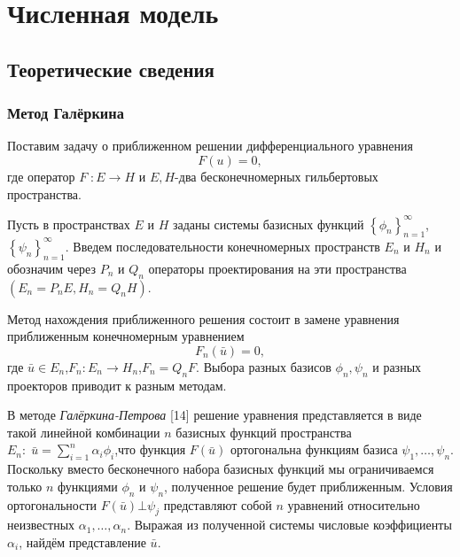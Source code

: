 \documentclass[a4paper,14pt]{extarticle}
\begin{document}
\newpage

\section{Численная модель}

\subsection{Теоретические сведения}

\subsubsection{Метод Галёркина}

Поставим задачу о приближенном решении дифференциального уравнения 
\begin{equation}
F(u)=0,
\end{equation}
где оператор $F\; : E \rightarrow H$ и $E,H$-два бесконечномерных гильбертовых пространства. 

Пусть в пространствах $E$ и $H$ заданы системы базисных функций  $\left\{\phi_n\right\}_{n=1}^\infty$, \\ $\left\{\psi_n\right\}_{n=1}^\infty$. Введем последовательности конечномерных пространств $E_n$ и $H_n$ и обозначим через $P_n$ и $Q_n$ операторы проектирования на эти пространства $(E_n=P_n E,H_n=Q_n H)$. 

Метод нахождения приближенного решения состоит в замене уравнения приближенным конечномерным уравнением 
\begin{equation}
F_n(\bar{u})=0,
\end{equation}
где $\bar{u}\in E_n$,$F_n:E_n\rightarrow H_n$,$F_n=Q_n F$. Выбора разных базисов $\phi_n,\psi_n$ и разных проекторов приводит к разным методам. 

В методе \textit{Галёркина-Петрова} [14] решение уравнения представляется в виде такой линейной комбинации $n$ базисных функций пространства $E_n :\; \bar{u}=\sum\limits_{i=1}^n{\alpha_i \phi_i}$,что функция $F(\bar{u})$ ортогональна функциям базиса $\psi_1,\ldots,\psi_n$. Поскольку вместо бесконечного набора базисных функций мы ограничиваемся только $n$ функциями $\phi_n$ и $\psi_n$, полученное решение будет приближенным. Условия ортогональности $F(\bar{u}) \bot \psi_j$ представляют собой $n$ уравнений относительно неизвестных $\alpha_1,\ldots,\alpha_n$. Выражая из полученной системы числовые коэффициенты $\alpha_i$, найдём представление $\bar{u}$. 
\end{document}
